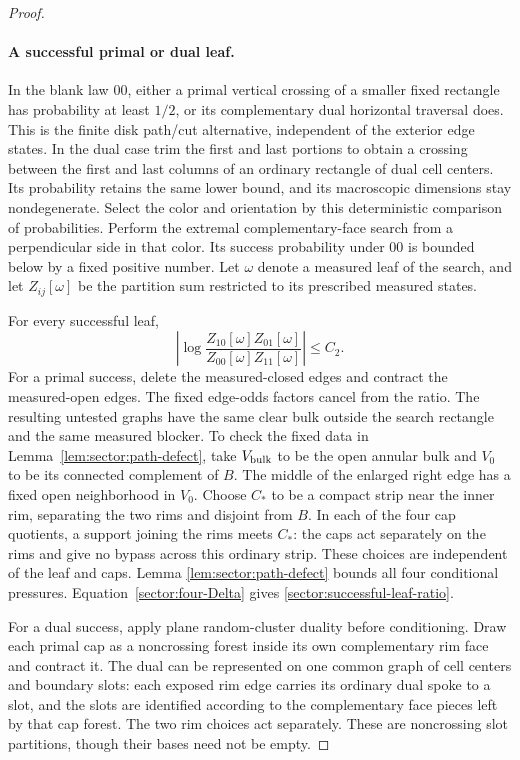 \begin{proof}
\paragraph{A successful primal or dual leaf.}
In the blank law $00$, either a primal vertical crossing of a smaller
fixed rectangle has probability at least $1/2$, or its complementary
dual horizontal traversal does.  This is the finite disk path/cut
alternative, independent of the exterior edge states.  In the dual
case trim the first and last portions to obtain a crossing between
the first and last columns of an ordinary rectangle of dual cell
centers.  Its probability retains the same lower bound, and its
macroscopic dimensions stay nondegenerate.  Select the color and
orientation by this deterministic comparison of probabilities.
Perform the extremal complementary-face search from a perpendicular
side in that color.  Its success probability under $00$ is bounded
below by a fixed positive number.  Let $\omega$ denote a measured
leaf of the search, and let $Z_{ij}[\omega]$ be the partition sum
restricted to its prescribed measured states.

For every successful leaf,
\begin{equation}
 \left|\log\frac{Z_{10}[\omega]Z_{01}[\omega]}
                         {Z_{00}[\omega]Z_{11}[\omega]}\right|
 \le C_2.
 \label{sector:successful-leaf-ratio}
\end{equation}
For a primal success, delete the measured-closed edges and contract
the measured-open edges.  The fixed edge-odds factors cancel from
the ratio.  The resulting untested graphs have the same clear bulk
outside the search rectangle and the same measured blocker.  To check
the fixed data in Lemma~\ref{lem:sector:path-defect}, take
$V_{\rm bulk}$ to be the open annular bulk and $V_0$ to be its connected
complement of $B$.  The middle of the enlarged right edge has a fixed
open neighborhood in $V_0$.  Choose $C_*$ to be a compact strip near
the inner rim, separating the two rims and disjoint from $B$.
In each of the four cap quotients, a support joining the rims meets
$C_*$: the caps act separately on the rims and give no bypass across
this ordinary strip.  These choices are independent of the leaf and
caps.  Lemma
\ref{lem:sector:path-defect} bounds all four conditional pressures.
Equation~\eqref{sector:four-Delta} gives
\eqref{sector:successful-leaf-ratio}.

For a dual success, apply plane random-cluster duality before
conditioning.  Draw each primal cap as a noncrossing forest inside
its own complementary rim face and contract it.  The dual can be
represented on one common graph of cell centers and boundary slots:
each exposed rim edge carries its ordinary dual spoke to a slot,
and the slots are identified according to the complementary face
pieces left by that cap forest.  The two rim choices act separately.
These are noncrossing slot partitions, though their bases need not
be empty.


\end{proof}
